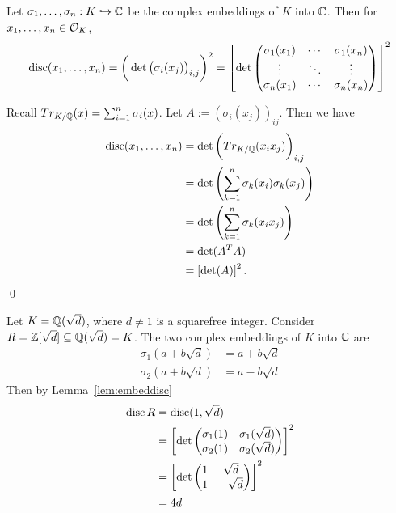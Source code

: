 \begin{lem}\label{lem:embeddisc}
Let $\sigma_1,\ldots,\sigma_n: K \hookrightarrow \mathbb{C}$ be the complex embeddings of $K$ into $\mathbb{C}$. Then for $x_1,\ldots,x_n \in \mathcal{O}_K$,
	\[
	\operatorname{disc}(x_1,\ldots,x_n)= \bigg(\det \big(\sigma_i(x_j)\big)_{i,j} \bigg)^2= \left[\det 
	\begin{pmatrix}
	\sigma_1(x_1) & \cdots & \sigma_1(x_n) \\
	\vdots & \ddots & \vdots \\
	\sigma_n(x_1) & \cdots & \sigma_n(x_n)
	\end{pmatrix}\right]^2
	\]
\end{lem}

\pf Recall $Tr_{K/\mathbb{Q}}(x)= \sum_{i=1}^n \sigma_i(x)$. Let $A:=(\sigma_i(x_j))_{ij}$. Then we have
	\[
	\begin{split}
	\operatorname{disc}(x_1,\ldots,x_n)&= \det\bigg(Tr_{K/\mathbb{Q}}(x_ix_j)\bigg)_{i,j} \\
	&=\det\left(\sum_{k=1}^n \sigma_k(x_i) \sigma_k(x_j) \right) \\
	&=\det\left(\sum_{k=1}^n \sigma_k(x_i x_j) \right) \\
	&= \det( A^TA) \\
	&= \left[ \det(A) \right]^2.
	\end{split}
	\]
\qed \\


\begin{ex}
Let $K=\mathbb{Q}(\sqrt{d})$, where $d \neq 1$ is a squarefree integer. Consider $R=\mathbb{Z}[\sqrt{d}] \subseteq \mathbb{Q}(\sqrt{d})=K$. The two complex embeddings of $K$ into $\mathbb{C}$ are 
	\[
	\begin{split}
	\sigma_1(a+b\sqrt{d})&= a + b\sqrt{d} \\
	\sigma_2(a+b\sqrt{d})&= a - b\sqrt{d}
	\end{split}
	\]
Then by Lemma~\ref{lem:embeddisc}
	\[
	\begin{split}
	\operatorname{disc} R&= \operatorname{disc}(1,\sqrt{d}) \\
	&=\left[\det \begin{pmatrix}
	\sigma_1(1) & \sigma_1(\sqrt{d}) \\
	\sigma_2(1) & \sigma_2(\sqrt{d})
	\end{pmatrix} \right]^2 \\
	&= \left[\det \begin{pmatrix}
	1 & \sqrt{d} \\
	1 & -\sqrt{d}
	\end{pmatrix} \right]^2 \\
	&= 4d
	\end{split}
	\] \xqed
\end{ex}


